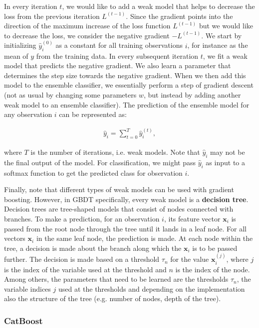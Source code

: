 \documentclass{article}
\begin{document}
	In every iteration $t$, we would like to add a weak model that helps to decrease the loss from the previous iteration $L^{(t-1)}$. Since the gradient points into the direction of the maximum increase of the loss function $L^{(t-1)}$ but we would like to decrease the loss, we consider the negative gradient $-L^{(t-1)}$.
	We start by initializing $\hat{y}_i^{(0)}$ as a constant for all training observations $i$, for instance as the mean of $y$ from the training data. In every subsequent iteration $t$, we fit a weak model that predicts the negative gradient. We also learn a parameter that determines the step size towards the negative gradient. When we then add this model to the ensemble classifier, we essentially perform a step of gradient descent (not as usual by changing some parameters $w$, but instead by adding another weak model to an ensemble classifier). The prediction of the ensemble model for any observation $i$ can be represented as:
	
	\begin{align}
	 \hat{y}_i = \sum_{t = 0}^T \hat{y}_i^{(t)}, 
	\end{align}
	
	where $T$ is the number of iterations, i.e. weak models. Note that $\hat{y}_i$ may not be the final output of the model. For classification, we might pass $\hat{y}_i$ as input to a softmax function to get the predicted class for observation $i$.
	
	Finally, note that different types of weak models can be used with gradient boosting. However, in GBDT specifically, every weak model is a \textbf{decision tree}. Decision trees are tree-shaped models that consist of nodes connected with branches. To make a prediction, for an observation $i$, its feature vector $\textbf{x}_i$ is passed from the root node through the tree until it lands in a leaf node. For all vectors $\textbf{x}_i$ in the same leaf node, the prediction is made. At each node within the tree, a decision is made about the branch along which the $\textbf{x}_i$ is to be passed further. The decision is made based on a threshold $\tau_n$ for the value $\textbf{x}_{i}^{(j)}$, where $j$ is the index of the variable used at the threshold and $n$ is the index of the node. Among others, the parameters that need to be learned are the thresholds $\tau_n$, the variable indices $j$ used at the thresholds and depending on the implementation also the structure of the tree (e.g. number of nodes, depth of the tree).


	\subsubsection{CatBoost}
	
\end{document}
